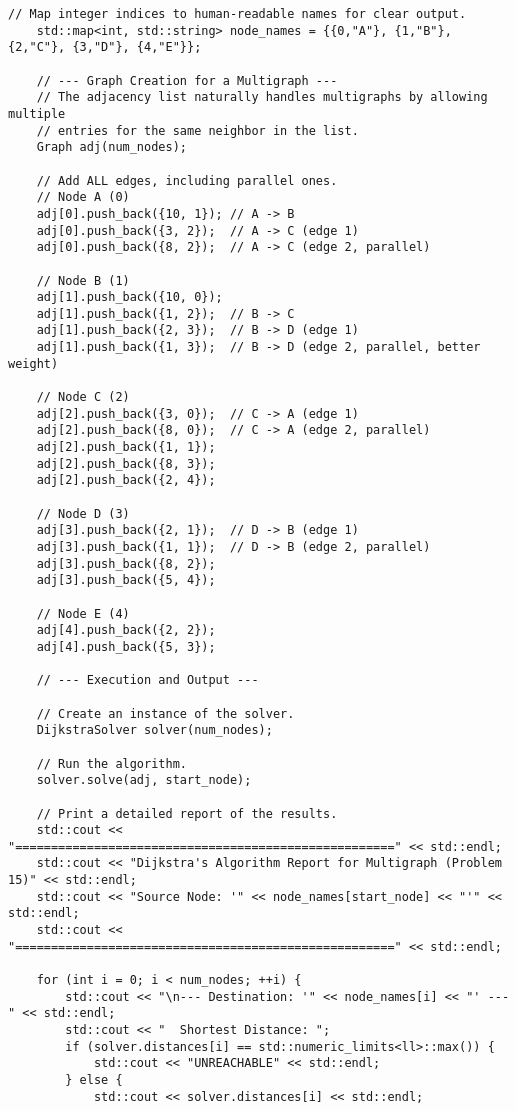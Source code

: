 \documentclass[a4paper,12pt]{article}
\begin{document}
\begin{lstlisting}[style=cppstyle, caption={Xây dựng đa đồ thị trong C++. Logic thuật toán không đổi.}, label={lst:cpp_multi_full}]
    // Map integer indices to human-readable names for clear output.
    std::map<int, std::string> node_names = {{0,"A"}, {1,"B"}, {2,"C"}, {3,"D"}, {4,"E"}};
    
    // --- Graph Creation for a Multigraph ---
    // The adjacency list naturally handles multigraphs by allowing multiple
    // entries for the same neighbor in the list.
    Graph adj(num_nodes);
    
    // Add ALL edges, including parallel ones.
    // Node A (0)
    adj[0].push_back({10, 1}); // A -> B
    adj[0].push_back({3, 2});  // A -> C (edge 1)
    adj[0].push_back({8, 2});  // A -> C (edge 2, parallel)
    
    // Node B (1)
    adj[1].push_back({10, 0});
    adj[1].push_back({1, 2});  // B -> C
    adj[1].push_back({2, 3});  // B -> D (edge 1)
    adj[1].push_back({1, 3});  // B -> D (edge 2, parallel, better weight)
    
    // Node C (2)
    adj[2].push_back({3, 0});  // C -> A (edge 1)
    adj[2].push_back({8, 0});  // C -> A (edge 2, parallel)
    adj[2].push_back({1, 1});
    adj[2].push_back({8, 3});
    adj[2].push_back({2, 4});
    
    // Node D (3)
    adj[3].push_back({2, 1});  // D -> B (edge 1)
    adj[3].push_back({1, 1});  // D -> B (edge 2, parallel)
    adj[3].push_back({8, 2});
    adj[3].push_back({5, 4});
    
    // Node E (4)
    adj[4].push_back({2, 2});
    adj[4].push_back({5, 3});
    
    // --- Execution and Output ---
    
    // Create an instance of the solver.
    DijkstraSolver solver(num_nodes);
    
    // Run the algorithm.
    solver.solve(adj, start_node);

    // Print a detailed report of the results.
    std::cout << "=====================================================" << std::endl;
    std::cout << "Dijkstra's Algorithm Report for Multigraph (Problem 15)" << std::endl;
    std::cout << "Source Node: '" << node_names[start_node] << "'" << std::endl;
    std::cout << "=====================================================" << std::endl;

    for (int i = 0; i < num_nodes; ++i) {
        std::cout << "\n--- Destination: '" << node_names[i] << "' ---" << std::endl;
        std::cout << "  Shortest Distance: ";
        if (solver.distances[i] == std::numeric_limits<ll>::max()) {
            std::cout << "UNREACHABLE" << std::endl;
        } else {
            std::cout << solver.distances[i] << std::endl;
            

\end{lstlisting}
\end{document}
